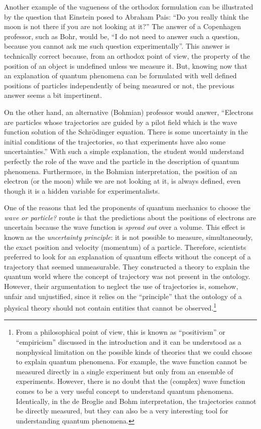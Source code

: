 \documentclass[nofootinbib, secnumarabic, amsmath, nobibnotes,10pt,aps,pra]{revtex4-1}
\begin{document}
Another example of the vagueness of the orthodox formulation can be illustrated by the question that Einstein posed to Abraham Pais: ``Do you really think the moon is not there if you are not looking at it?'' The answer of a Copenhagen professor, such as Bohr, would be, ``I do not need to answer such a question, because you cannot ask me such question experimentally''. This answer is technically correct because, from an orthodox point of view, the property of the position of an object is undefined unless we measure it. But, knowing now that an explanation of quantum phenomena can be formulated with well defined positions of particles independently of being measured or not, the previous answer seems a bit impertinent. 

On the other hand, an alternative (Bohmian) professor would answer,
``Electrons are particles whose trajectories are guided by a pilot
field which is  the wave function solution of the Schr\"odinger
equation. There is some uncertainty in the initial conditions of the
trajectories, so that experiments have also some uncertainties.''
With such a simple explanation, the student would understand
perfectly the role of the wave and the particle in the description
of quantum phenomena. Furthermore, in the Bohmian interpretation,
the position of an electron (or the moon) while we are not looking
at it, is always defined, even though it is a hidden variable  for experimentalists.

One of the reasons that led the proponents of quantum mechanics to
choose the \textit{wave or particle?} route is that the predictions
about the positions of electrons are uncertain because the wave
function is \textit{spread out} over a volume. This effect is known
as the \textit{uncertainty principle}: it is not possible to
measure, simultaneously, the exact position and velocity (momentum)
of a particle. Therefore, scientists preferred to look for an
explanation of quantum effects without the concept of a trajectory
that seemed unmeasurable. They constructed a theory to explain the quantum world where the concept of trajectory was not present in the ontology. However, their argumentation to neglect the use of trajectories is, somehow, unfair and
unjustified, since it relies on the ``principle'' that the ontology of a physical
theory should not contain entities that cannot be
observed.\footnote{From a philosophical point of view, this is known
as ``positivism'' or ``empiricism'' discussed in the introduction and it can be understood as a nonphysical
limitation on the possible kinds of theories that we could choose to
explain quantum phenomena. For example, the wave function cannot be
measured directly in a single experiment but only from
an ensemble of experiments. However, there is no doubt that the
(complex) wave function comes to be a very useful
concept to understand quantum phenomena. Identically, in the de
Broglie and Bohm interpretation, the trajectories cannot be directly measured, but they can also be a very interesting tool for
understanding quantum phenomena.}
\end{document}
